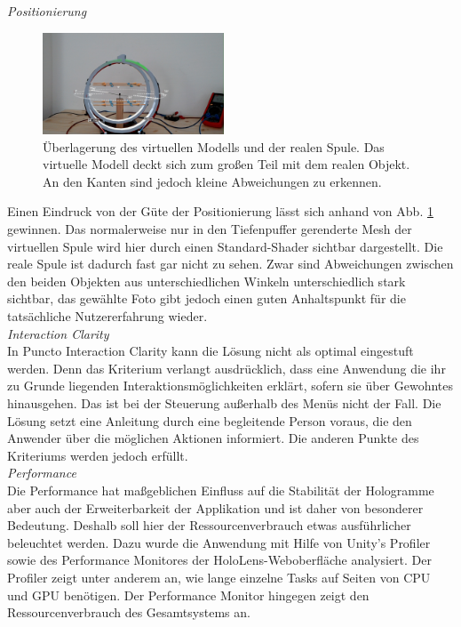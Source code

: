 \textit{Positionierung}
\begin{figure}
	\centering
	\includegraphics[width=0.48\textwidth]{images/HL/model-overlay.jpg}
	\caption{Überlagerung des virtuellen Modells und der realen Spule. Das virtuelle Modell deckt sich zum großen Teil mit dem realen Objekt. An den Kanten sind jedoch kleine Abweichungen zu erkennen.}
	\label{img:model-overlay}
\end{figure}
Einen Eindruck von der Güte der Positionierung lässt sich anhand von Abb. \ref{img:model-overlay} gewinnen. Das normalerweise nur in den Tiefenpuffer gerenderte Mesh der virtuellen Spule wird hier durch einen Standard-Shader sichtbar dargestellt. Die reale Spule ist dadurch fast gar nicht zu sehen. Zwar sind Abweichungen zwischen den beiden Objekten aus unterschiedlichen Winkeln unterschiedlich stark sichtbar, das gewählte Foto gibt jedoch einen guten Anhaltspunkt für die tatsächliche Nutzererfahrung wieder.\\

\textit{Interaction Clarity}\\
In Puncto Interaction Clarity kann die Lösung nicht als optimal eingestuft werden. Denn das Kriterium verlangt ausdrücklich, dass eine Anwendung die ihr zu Grunde liegenden Interaktionsmöglichkeiten erklärt, sofern sie über Gewohntes hinausgehen. Das ist bei der Steuerung außerhalb des Menüs nicht der Fall. Die Lösung setzt eine Anleitung durch eine begleitende Person voraus, die den Anwender über die möglichen Aktionen informiert. Die anderen Punkte des Kriteriums werden jedoch erfüllt.\\

\textit{Performance}\\
Die Performance hat maßgeblichen Einfluss auf die Stabilität der Hologramme aber auch der Erweiterbarkeit der Applikation und ist daher von besonderer Bedeutung. Deshalb soll hier der Ressourcenverbrauch etwas ausführlicher beleuchtet werden. Dazu wurde die Anwendung mit Hilfe von Unity's Profiler sowie des Performance Monitores der HoloLens-Weboberfläche analysiert. Der Profiler zeigt unter anderem an, wie lange einzelne Tasks auf Seiten von CPU und GPU benötigen. Der Performance Monitor hingegen zeigt den Ressourcenverbrauch des Gesamtsystems an.\\

